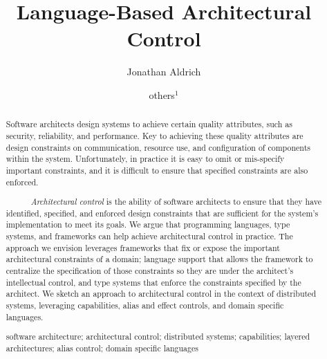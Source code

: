 \documentclass[runningheads]{llncs}
\newcommand{\keywords}[1]{\par\addvspace\baselineskip
\noindent\keywordname\enspace\ignorespaces#1}
\begin{document}
\title{Language-Based Architectural Control}
\author{Jonathan Aldrich \and others$^{1}$}
\setlength{\abovecaptionskip}{0pt}
\setlength{\belowcaptionskip}{0pt}

\maketitle

\begin{sloppypar}
\begin{abstract}
Software architects design systems to achieve certain quality attributes, such as security, reliability, and performance. Key to achieving these quality attributes are design constraints on communication, resource use, and configuration of components within the system. Unfortunately, in practice it is easy to omit or mis-specify important constraints, and it is difficult to ensure that specified constraints are also enforced. 

~~~~~~\emph{Architectural control} is the ability of software architects to ensure that they have identified, specified, and enforced design constraints that are sufficient for the system's implementation to meet its goals. We argue that programming languages, type systems, and frameworks can help achieve architectural control in practice. The approach we envision leverages frameworks that fix or expose the important architectural constraints of a domain; language support that allows the framework to centralize the specification of those constraints so they are under the architect's intellectual control, and type systems that enforce the constraints specified by the architect. We sketch an approach to architectural control in the context of distributed systems, leveraging capabilities, alias and effect controls, and domain specific languages.

\keywords{software architecture;
architectural control;
distributed systems;
capabilities;
layered architectures;
alias control;
domain specific languages}

\end{abstract}




\end{sloppypar}
\end{document}
